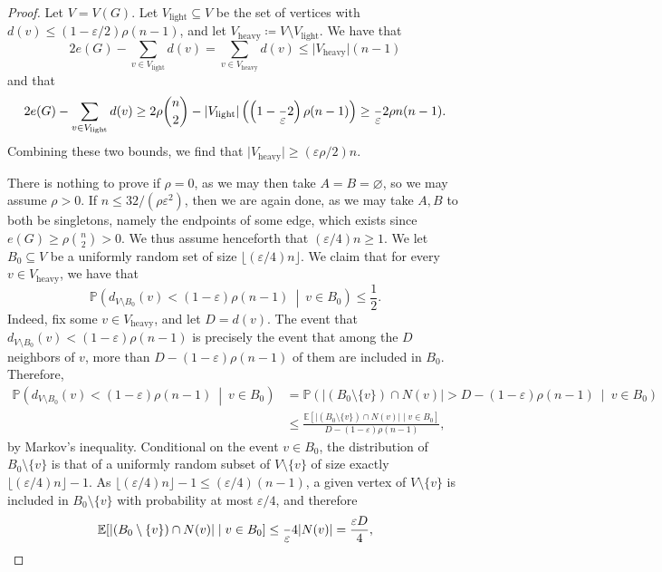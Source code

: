 \documentclass{aic}
\theoremstyle{plain}
\theoremstyle{remark}
\def\E{\mathbb{E}}
\newcommand{\eps}{\ensuremath{\varepsilon}}
\let\emptyset\varnothing
\newcommand\ab[1]{\lvert #1 \rvert}
\newcommand\flo[1]{\lfloor #1 \rfloor}
\renewcommand{\P}{\mathbb{P}}
\begin{document}
\begin{proof}
    Let $V=V(G)$.
    Let $V_{\mathrm{light}}\subseteq V$ be the set of vertices with $d(v)\le (1-\eps/2)\rho (n-1)$, and let $V_{\mathrm{heavy}}\coloneqq V\setminus V_{\mathrm{light}}$. We have that 
    \[
    2e(G) - \sum_{v \in V_{\mathrm{light}}} d(v) = \sum_{v \in V_{\mathrm{heavy}}} d(v) \leq \ab{V_{\mathrm{heavy}}} (n-1)
    \]
    and that
    \[
     2e(G)-\sum_{v\in V_{\mathrm{light}}}d(v) \geq 2\rho \binom n2 - \ab{V_{\mathrm{light}}}\left(\left(1-\frac \eps 2\right) \rho (n-1)\right) \geq \frac \eps 2 \rho n(n-1).
    \]
    Combining these two bounds, we find that $\ab{V_{\mathrm{heavy}}}\geq (\eps \rho/2)n$.

    There is nothing to prove if $\rho=0$, as we may then take $A=B=\emptyset$, so we may assume $\rho>0$.
    If $n\leq 32/(\rho\eps^2)$, then we are again done, as we may take $A,B$ to both be singletons, namely the endpoints of some edge, which exists since $e(G) \geq \rho\binom n2>0$. We thus assume henceforth that $(\eps/4)n\geq 1$.
    We let $B_0\subseteq V$ be a uniformly random set of size $\flo{ (\eps/4)n} $. 
    We claim that for every $v \in V_{\mathrm{heavy}}$, we have that
    \begin{equation}\label{eq:heavy vtx}
        \P\left(d_{V\setminus B_0}(v)< (1-\eps)\rho (n-1) ~\middle|~ v\in B_0\right) \leq \frac 12.
    \end{equation}
    Indeed, fix some $v \in V_{\mathrm{heavy}}$, and let $D=d(v)$. The event that $d_{V \setminus B_0}(v) < (1-\varepsilon)\rho(n-1)$ is precisely the event that among the $D$ neighbors of $v$, more than $D-(1-\varepsilon)\rho(n-1)$ of them are included in $B_0$. Therefore,
    \begin{align*}
       \P\left(d_{V\setminus B_0}(v)< (1-\eps)\rho (n-1) ~\middle|~ v\in B_0\right) &= \P\left(\ab{(B_0 \setminus \{v\}) \cap N(v)}>D-(1-\varepsilon)\rho(n-1) ~\middle|~ v \in B_0\right)\\
        &\leq \frac{\E[\ab{(B_0 \setminus \{v\})\cap N(v)} \mid v \in B_0]}{D-(1-\varepsilon)\rho(n-1)},
    \end{align*}
    by Markov's inequality. 
    Conditional on the event $v \in B_0$, the distribution of $B_0 \setminus\{v\}$ is that of a uniformly random subset of $V \setminus \{v\}$ of size exactly $\flo{(\varepsilon/4)n}-1$.
    As $\flo{(\eps/4)n}-1 \leq (\eps/4)(n-1)$, a given vertex of $V \setminus \{v\}$ is included in $B_0 \setminus \{v\}$ with probability at most $\eps/4$, and therefore
    \[
    \E[\ab{(B_0 \setminus \{v\})\cap N(v)} \mid v \in B_0] \leq \frac \eps 4 \ab{N(v)} = \frac{\eps D}{4},
\]
\end{proof}
\end{document}
